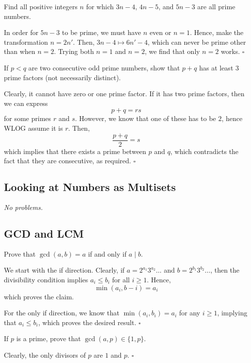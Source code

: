 \documentclass{article}
\newcommand{\noproblems}{\emph{No problems.}}
\begin{document}
\begin{problem}[1.4.1]{}
Find all positive integers $n$ for which $3n-4$, $4n-5$, and $5n-3$ are all prime numbers.
\end{problem}
In order for $5n-3$ to be prime, we must have $n$ even or $n = 1$. Hence, make the transformation $n = 2n'$. Then, $3n-4 \mapsto 6n'-4$, which can never be prime other than when $n = 2$. Trying both $n=1$ and $n=2$, we find that only $n = \boxed{2}$ works. $\square$

\begin{problem}[1.4.2]{}
If $p < q$ are two consecutive odd prime numbers, show that $p + q$ has at least $3$ prime factors (not necessarily distinct).
\end{problem}
Clearly, it cannot have zero or one prime factor. If it has two prime factors, then we can express \[p+q = rs\] for some primes $r$ and $s$. However, we know that one of these has to be $2$, hence WLOG assume it is $r$. Then, \[\dfrac{p+q}{2} = s\] which implies that there exists a prime between $p$ and $q$, which contradicts the fact that they are consecutive, as required. $\square$

\subsection{Looking at Numbers as Multisets}

\noproblems

\subsection{GCD and LCM}

\begin{problem}[1.6.1]{}
Prove that $\gcd(a, b) = a$ if and only if $a \mid b$.
\end{problem}
We start with the if direction. Clearly, if $a = 2^{a_1}3^{a_2}\dots$ and $b = 2^{b_1}3^{b_2}\dots$, then the divisibility condition implies $a_i \le b_i$ for all $i \ge 1$. Hence, \[\min(a_i, b-i) = a_i\] which proves the claim.

For the only if direction, we know that $\min(a_i, b_i) = a_i$ for any $i \ge 1$, implying that $a_i \le b_i$, which proves the desired result. $\square$

\begin{problem}[1.6.2]{}
If $p$ is a prime, prove that $\gcd(a, p) \in \{1, p\}$.
\end{problem}
Clearly, the only divisors of $p$ are $1$ and $p$. $\square$
\end{document}
